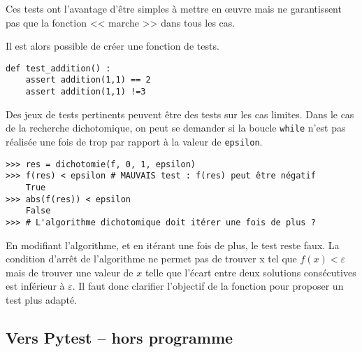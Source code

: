 Ces tests ont l'avantage d'être simples à mettre en \oe{}uvre mais ne garantissent pas que la fonction << marche >> dans tous les cas. 

Il est alors possible de créer une fonction de tests. 
\begin{lstlisting}
def test_addition() :
    assert addition(1,1) == 2
    assert addition(1,1) !=3
\end{lstlisting}

Des jeux de tests pertinents peuvent être des tests sur les cas limites. 
Dans le cas de la recherche dichotomique, on peut se demander si la boucle \texttt{while} n'est pas réalisée une fois de trop par rapport à la valeur de \texttt{epsilon}.

\begin{lstlisting}
>>> res = dichotomie(f, 0, 1, epsilon)
>>> f(res) < epsilon # MAUVAIS test : f(res) peut être négatif
    True
>>> abs(f(res)) < epsilon 
    False 
>>> # L'algorithme dichotomique doit itérer une fois de plus ?
\end{lstlisting}

En modifiant l'algorithme, et en itérant une fois de plus, le test reste faux. La condition d'arrêt de l'algorithme ne permet pas de trouver x tel que $f(x)<\varepsilon$ mais de trouver une valeur de $x$ telle que l'écart entre deux solutions consécutives est inférieur à $\varepsilon$. Il faut donc clarifier l'objectif de la fonction pour proposer un test plus adapté.



\subsection{Vers Pytest -- hors programme}



